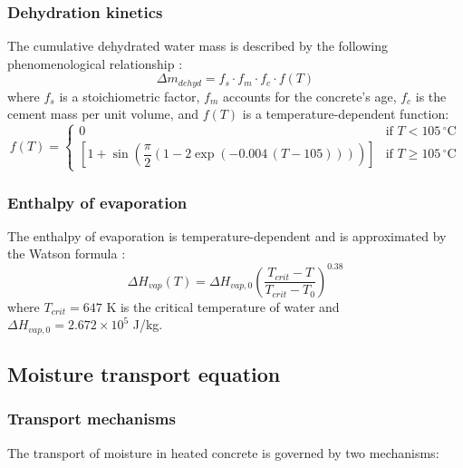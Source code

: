 \subsubsection{Dehydration kinetics}
The cumulative dehydrated water mass is described by the following phenomenological relationship \cite{dauti2018}:
\begin{equation}
    \Delta m_{dehyd} = f_s \cdot f_m \cdot f_c \cdot f(T) \label{eq:dehyd}
\end{equation}
where $f_s$ is a stoichiometric factor, $f_m$ accounts for the concrete's age, $f_c$ is the cement mass per unit volume, and $f(T)$ is a temperature-dependent function:
\begin{equation}
    f(T) = 
    \begin{cases}
        0 & \text{if } T < 105\,^\circ\text{C} \\[4pt] \left[1 + \sin\!\left(\dfrac{\pi}{2}\left(1 - 2\exp(-0.004\,(T - 105))\right)\right)\right] & \text{if } T \geq 105\,^\circ\text{C}
    \end{cases}
    \label{eq:fT_dehyd}
\end{equation}

\subsubsection{Enthalpy of evaporation}
The enthalpy of evaporation is temperature-dependent and is approximated by the Watson formula \cite{dauti2018}:
\begin{equation}
    \Delta H_{vap}(T) = \Delta H_{vap,0}
    \left(\frac{T_{crit} - T}{T_{crit} - T_0}
    \right)^{0.38}
    \label{eq:Hvap}
\end{equation}
where $T_{crit} = 647$ K is the critical temperature of water and $\Delta H_{vap,0} = 2.672 \times 10^5$ J/kg.

\subsection{Moisture transport equation} \label{sec:moisture}
\subsubsection{Transport mechanisms}

The transport of moisture in heated concrete is governed by two mechanisms:

